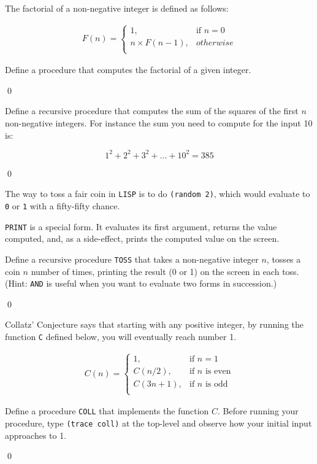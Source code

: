 \documentclass[a4paper,11pt]{article}
\begin{document}
\begin{uexercise}

The factorial of a non-negative integer is defined as follows:

\begin{align}
F(n) =  
\begin{cases}
1, & \text{if }n = 0\\
n \times F(n-1), & otherwise \\
\end{cases}
\end{align}

Define a procedure that computes the factorial of a given integer.

\qed
\end{uexercise}

\begin{uexercise}
Define a recursive procedure that computes the sum of the squares of the first $n$ non-negative integers. For instance the sum you need to compute for the input 10 is:

$$
1^2 + 2^2 + 3^2 + \ldots + 10^2 = 385
$$

\qed
\end{uexercise}

\begin{uexercise}
The way to toss a fair coin in \Verb+LISP+ is to do \Verb+(random 2)+, which would evaluate to \Verb+0+ or \Verb+1+ with a fifty-fifty chance.

\Verb+PRINT+ is a special form. It evaluates its first argument, returns the value computed, and, as a side-effect, prints the computed value on the screen.

Define a recursive procedure \Verb+TOSS+ that takes a non-negative integer $n$, tosses a coin $n$ number of times, printing the result (0 or 1) on the screen in each toss. (Hint: \Verb+AND+ is useful when you want to evaluate two forms in succession.)

\qed
\end{uexercise}

\begin{uexercise}
\label{collatzdef}

Collatz' Conjecture says that starting with any positive integer, by running the function \Verb+C+ defined below, you will eventually reach number 1.

\begin{align}
C(n) =  
\begin{cases}
1, & \text{if } n = 1 \\
C(n/2), & \text{if }n\text{ is even}\\ 
C(3n+1), & \text{if }n\text{ is odd}\\ 
\end{cases}
\end{align}

Define a procedure \Verb+COLL+ that implements the function $C$. Before running your procedure, type \Verb+(trace coll)+ at the top-level and observe how your initial input approaches to 1. 

\qed
\end{uexercise}
\end{document}
